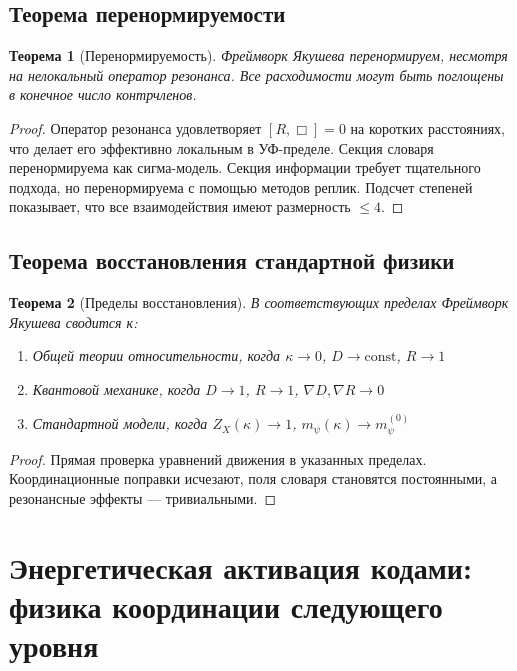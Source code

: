 \documentclass[11pt,a4paper]{article}
\newtheorem{theorem}{Теорема}
\begin{document}
	\subsection{Теорема перенормируемости}
	
	\begin{theorem}[Перенормируемость]
		Фреймворк Якушева перенормируем, несмотря на нелокальный оператор резонанса. Все расходимости могут быть поглощены в конечное число контрчленов.
	\end{theorem}
	
	\begin{proof}
		Оператор резонанса удовлетворяет $[R, \Box] = 0$ на коротких расстояниях, что делает его эффективно локальным в УФ-пределе. Секция словаря перенормируема как сигма-модель. Секция информации требует тщательного подхода, но перенормируема с помощью методов реплик. Подсчет степеней показывает, что все взаимодействия имеют размерность $\leq 4$.
	\end{proof}
	
	\subsection{Теорема восстановления стандартной физики}
	
	\begin{theorem}[Пределы восстановления]
		В соответствующих пределах Фреймворк Якушева сводится к:
		\begin{enumerate}
			\item Общей теории относительности, когда $\kappa \to 0$, $D \to \text{const}$, $R \to 1$
			\item Квантовой механике, когда $D \to 1$, $R \to 1$, $\nabla D, \nabla R \to 0$
			\item Стандартной модели, когда $Z_X(\kappa) \to 1$, $m_\psi(\kappa) \to m_\psi^{(0)}$
		\end{enumerate}
	\end{theorem}
	
	\begin{proof}
		Прямая проверка уравнений движения в указанных пределах. Координационные поправки исчезают, поля словаря становятся постоянными, а резонансные эффекты — тривиальными.
	\end{proof}
	\section{Энергетическая активация кодами: физика координации следующего уровня}
	\label{sec:energy-activation}
	
\end{document}
